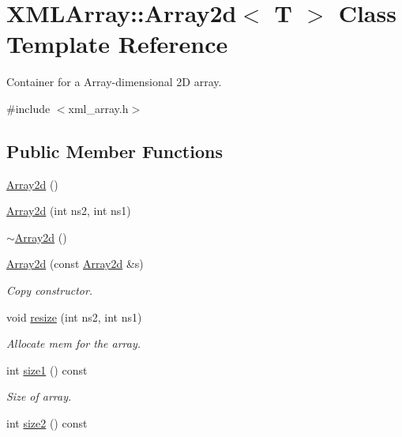 \hypertarget{classXMLArray_1_1Array2d}{}\section{X\+M\+L\+Array\+:\+:Array2d$<$ T $>$ Class Template Reference}
\label{classXMLArray_1_1Array2d}


Container for a Array-\/dimensional 2D array.  




{\ttfamily \#include $<$xml\+\_\+array.\+h$>$}

\subsection*{Public Member Functions}
\begin{DoxyCompactItemize}
\item 
\mbox{\hyperlink{classXMLArray_1_1Array2d_a2f24eccb279e2f1685b58b41f61d9330}{Array2d}} ()
\item 
\mbox{\hyperlink{classXMLArray_1_1Array2d_acb1e955b2aa805f3192c50cd723df524}{Array2d}} (int ns2, int ns1)
\item 
\mbox{\hyperlink{classXMLArray_1_1Array2d_a57639b142c7754fa2c11bb3ac5ee76d7}{$\sim$\+Array2d}} ()
\item 
\mbox{\hyperlink{classXMLArray_1_1Array2d_a0646ba9d0ce7616c1cc4a84a4794b186}{Array2d}} (const \mbox{\hyperlink{classXMLArray_1_1Array2d}{Array2d}} \&s)
\begin{DoxyCompactList}\small\item\em Copy constructor. \end{DoxyCompactList}\item 
void \mbox{\hyperlink{classXMLArray_1_1Array2d_a64001cb2aac062d2179a0285b0279244}{resize}} (int ns2, int ns1)
\begin{DoxyCompactList}\small\item\em Allocate mem for the array. \end{DoxyCompactList}\item 
int \mbox{\hyperlink{classXMLArray_1_1Array2d_a0f5dd764b391ddffd3d89c71bbc6c614}{size1}} () const
\begin{DoxyCompactList}\small\item\em Size of array. \end{DoxyCompactList}\item 
int \mbox{\hyperlink{classXMLArray_1_1Array2d_a76f5ee9f75435c61089021f8cfbb6bf8}{size2}} () const
\item 

\end{DoxyCompactItemize}
